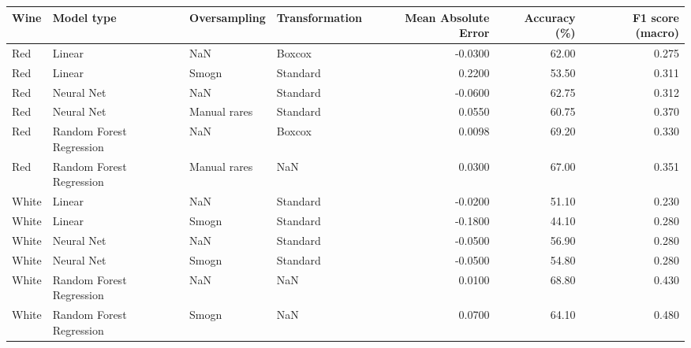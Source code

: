 \begin{tabular}{llllrrr}
\toprule
 Wine &               Model type & Oversampling & Transformation &  Mean Absolute Error &  Accuracy (\%) &  F1 score (macro) \\
\midrule
  Red &                   Linear &          NaN &         Boxcox &              -0.0300 &         62.00 &             0.275 \\
  Red &                   Linear &        Smogn &       Standard &               0.2200 &         53.50 &             0.311 \\
  Red &               Neural Net &          NaN &       Standard &              -0.0600 &         62.75 &             0.312 \\
  Red &               Neural Net & Manual rares &       Standard &               0.0550 &         60.75 &             0.370 \\
  Red & Random Forest Regression &          NaN &         Boxcox &               0.0098 &         69.20 &             0.330 \\
  Red & Random Forest Regression & Manual rares &            NaN &               0.0300 &         67.00 &             0.351 \\
White &                   Linear &          NaN &       Standard &              -0.0200 &         51.10 &             0.230 \\
White &                   Linear &        Smogn &       Standard &              -0.1800 &         44.10 &             0.280 \\
White &               Neural Net &          NaN &       Standard &              -0.0500 &         56.90 &             0.280 \\
White &               Neural Net &        Smogn &       Standard &              -0.0500 &         54.80 &             0.280 \\
White & Random Forest Regression &          NaN &            NaN &               0.0100 &         68.80 &             0.430 \\
White & Random Forest Regression &        Smogn &            NaN &               0.0700 &         64.10 &             0.480 \\
\bottomrule
\end{tabular}

